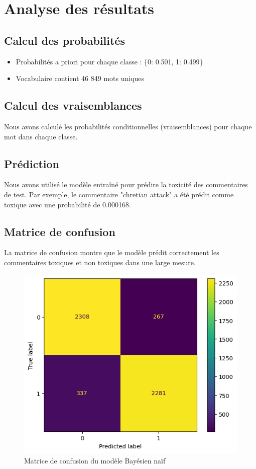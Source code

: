 \section{Analyse des résultats}

\subsection{Calcul des probabilités}

\begin{itemize}
    \item Probabilités a priori pour chaque classe : \{0: 0.501, 1: 0.499\}
    \item Vocabulaire contient 46 849 mots uniques
\end{itemize}

\subsection{Calcul des vraisemblances}

Nous avons calculé les probabilités conditionnelles (vraisemblances) pour chaque mot dans chaque classe.

\subsection{Prédiction}

Nous avons utilisé le modèle entraîné pour prédire la toxicité des commentaires de test. Par exemple, le commentaire "chretian attack" a été prédit comme toxique avec une probabilité de 0.000168.

\subsection{Matrice de confusion}

La matrice de confusion montre que le modèle prédit correctement les commentaires toxiques et non toxiques dans une large mesure.

\begin{figure}[h]
    \centering
    \includegraphics[width=.49\linewidth]{figures/matrix-confusion-naive_bayes.png}
    \caption{Matrice de confusion du modèle Bayésien naïf}
\end{figure}


